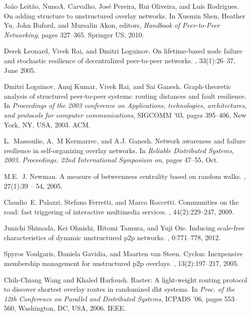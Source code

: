 \documentclass{www13-companion-accepted}
\begin{document}
\begin{thebibliography}{10}
João Leitão, NunoA. Carvalho, José Pereira, Rui Oliveira, and Luís
  Rodrigues.
\newblock On adding structure to unstructured overlay networks.
\newblock In Xuemin Shen, Heather Yu, John Buford, and Mursalin Akon, editors,
  {\em Handbook of Peer-to-Peer Networking}, pages 327--365. Springer US, 2010.

Derek Leonard, Vivek Rai, and Dmitri Loguinov.
\newblock On lifetime-based node failure and stochastic resilience of
  decentralized peer-to-peer networks.
, 33(1):26--37, June 2005.

Dmitri Loguinov, Anuj Kumar, Vivek Rai, and Sai Ganesh.
\newblock Graph-theoretic analysis of structured peer-to-peer systems: routing
  distances and fault resilience.
\newblock In {\em Proceedings of the 2003 conference on Applications,
  technologies, architectures, and protocols for computer communications},
  SIGCOMM '03, pages 395--406, New York, NY, USA, 2003. ACM.

L.~Massoulie, A.~M Kermarrec, and A.J. Ganesh.
\newblock Network awareness and failure resilience in self-organizing overlay
  networks.
\newblock In {\em Reliable Distributed Systems, 2003. Proceedings. 22nd
  International Symposium on}, pages 47--55, Oct.

M.E.~J. Newman.
\newblock A measure of betweenness centrality based on random walks.
, 27(1):39 -- 54, 2005.

Claudio~E. Palazzi, Stefano Ferretti, and Marco Roccetti.
\newblock Communities on the road: fast triggering of interactive multimedia
  services.
, 44(2):229--247, 2009.

Junichi Shimada, Kei Ohnishi, Hitomi Tamura, and Yuji Oie.
\newblock Inducing scale-free characteristics of dynamic unstructured p2p
  networks.
, 0:771--778, 2012.

Spyros Voulgaris, Daniela Gavidia, and Maarten van Steen.
\newblock Cyclon: Inexpensive membership management for unstructured p2p
  overlays.
, 13(2):197--217, 2005.

Chih-Chiang Wang and Khaled Harfoush.
\newblock Raster: A light-weight routing protocol to discover shortest overlay
  routes in randomized dht systems.
\newblock In {\em Proc. of the 12th Conference on Parallel and Distributed
  Systems}, ICPADS '06, pages 553--560, Washington, DC, USA, 2006. IEEE.

\end{thebibliography}
\end{document}
